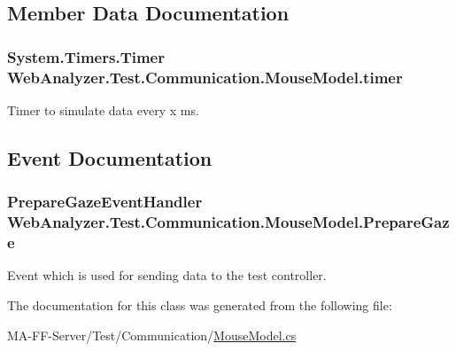 \subsection{Member Data Documentation}
\hypertarget{class_web_analyzer_1_1_test_1_1_communication_1_1_mouse_model_a59254b95befed343634d46aff30dd80b}{}
\subsubsection[{timer}]{\setlength{\rightskip}{0pt plus 5cm}System.\+Timers.\+Timer Web\+Analyzer.\+Test.\+Communication.\+Mouse\+Model.\+timer\hspace{0.3cm}{\ttfamily [private]}}\label{class_web_analyzer_1_1_test_1_1_communication_1_1_mouse_model_a59254b95befed343634d46aff30dd80b}


Timer to simulate data every x ms. 



\subsection{Event Documentation}
\hypertarget{class_web_analyzer_1_1_test_1_1_communication_1_1_mouse_model_ad799e6cf6032401ee7d8b1706d7c8a20}{}
\subsubsection[{Prepare\+Gaze}]{\setlength{\rightskip}{0pt plus 5cm}Prepare\+Gaze\+Event\+Handler Web\+Analyzer.\+Test.\+Communication.\+Mouse\+Model.\+Prepare\+Gaze}\label{class_web_analyzer_1_1_test_1_1_communication_1_1_mouse_model_ad799e6cf6032401ee7d8b1706d7c8a20}


Event which is used for sending data to the test controller. 



The documentation for this class was generated from the following file\+:\begin{DoxyCompactItemize}
\item 
M\+A-\/\+F\+F-\/\+Server/\+Test/\+Communication/\hyperlink{_mouse_model_8cs}{Mouse\+Model.\+cs}\end{DoxyCompactItemize}
